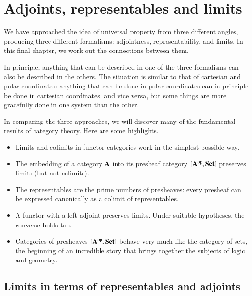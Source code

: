 %
%
%

\chapter{Adjoints, representables and limits}
\label{ch:arl}


We have approached the idea of universal property from three different
angles, producing three different formalisms: adjointness,
representability, and limits.  In this final chapter, we work out the
connections between them.

In principle, anything that can be described in one of the three formalisms
can also be described in the others.  The situation is similar to that of
cartesian and polar coordinates: anything that can be done in polar
coordinates can in principle be done in cartesian coordinates, and vice
versa, but some things are more gracefully done in one system than the
other.

In comparing the three approaches, we will discover many of the fundamental
results of category theory.  Here are some highlights.
%
\begin{itemize}
\item
Limits and colimits in functor categories work in the simplest possible
way.

\item
The embedding of a category $\mathbf{A}$ into its presheaf category
$[\mathbf{A}^{\mathrm{op}},\mathbf{Set}]$ preserves limits (but not colimits).

\item
The representables are the prime numbers of presheaves: every presheaf can
be expressed canonically as a colimit of representables.

\item
A functor with a left adjoint preserves limits.  Under suitable hypotheses,
the converse holds too.

\item
Categories of presheaves $[\mathbf{A}^{\mathrm{op}},\mathbf{Set}]$ behave very much like the
category of sets, the beginning of an incredible story that brings together
the subjects of logic and geometry.
\end{itemize}



\section{Limits in terms of representables and adjoints}
\label{sec:lra}


